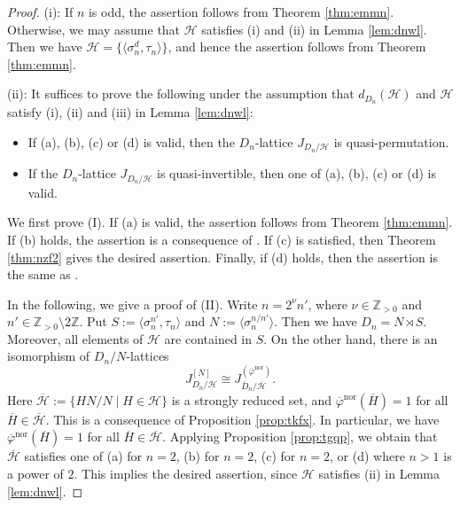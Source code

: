 \documentclass[12pt]{amsart}
\theoremstyle{plain}
\theoremstyle{definition}
\numberwithin{thm}{section}
\numberwithin{equation}{section}
\newcommand{\Zpn}{\mathbb{Z}_{>0}}
\newcommand{\Z}{\mathbb{Z}}
\newcommand{\cH}{\mathcal{H}}
\DeclareMathOperator{\nor}{nor}
\begin{document}
\begin{proof}
(i): If $n$ is odd, the assertion follows from Theorem \ref{thm:emmn}. Otherwise, we may assume that $\cH$ satisfies (i) and (ii) in Lemma \ref{lem:dnwl}. Then we have $\cH=\{\langle \sigma_{n}^{d},\tau_{n}\rangle\}$, and hence the assertion follows from Theorem \ref{thm:emmn}. 

(ii): It suffices to prove the following under the assumption that $d_{D_{n}}(\cH)$ and $\cH$ satisfy (i), (ii) and (iii) in Lemma \ref{lem:dnwl}: 
\begin{itemize}
    \item[(I)] If (a), (b), (c) or (d) is valid, then the $D_{n}$-lattice $J_{D_{n}/\cH}$ is quasi-permutation. 
    \item[(I\hspace{-1pt}I)] If the $D_{n}$-lattice $J_{D_{n}/\cH}$ is quasi-invertible, then one of (a), (b), (c) or (d) is valid. 
\end{itemize}
We first prove (I). If (a) is valid, the assertion follows from Theorem \ref{thm:emmn}. If (b) holds, the assertion is a consequence of \cite[Theorem 1.2 (ii)]{Hoshi2024}. If (c) is satisfied, then Theorem \ref{thm:nzf2} gives the desired assertion. Finally, if (d) holds, then the assertion is the same as \cite[Theorem 6.1]{Hasegawa}. 

In the following, we give a proof of (I\hspace{-1pt}I). Write $n=2^{\nu}n'$, where $\nu \in \Zpn$ and $n'\in \Zpn \setminus 2\Z$. Put $S:=\langle \sigma_{n}^{n'},\tau_{n}\rangle$ and $N:=\langle \sigma_{n}^{n/n'}\rangle$. Then we have $D_{n}=N \rtimes S$. Moreover, all elements of $\cH$ are contained in $S$. 
On the other hand, there is an isomorphism of $D_{n}/N$-lattices
\begin{equation*}
J_{D_{n}/\cH}^{[N]}\cong J_{\overline{D}_{n}/\overline{\cH}}^{(\overline{\varphi}^{\nor})}.  
\end{equation*}
Here $\overline{\cH}:=\{HN/N\mid H\in \cH\}$ is a strongly reduced set, and $\overline{\varphi}^{\nor}(\overline{H})=1$ for all $\overline{H}\in \overline{\cH}$. This is a consequence of Proposition \ref{prop:tkfx}. In particular, we have $\overline{\varphi}^{\nor}(\overline{H})=1$ for all $\overline{H}\in \overline{\cH}$. Applying Proposition \ref{prop:tgqp}, we obtain that $\overline{\cH}$ satisfies one of (a) for $n=2$, (b) for $n=2$, (c) for $n=2$, or (d) where $n>1$ is a power of $2$. This implies the desired assertion, since $\cH$ satisfies (ii) in Lemma \ref{lem:dnwl}. 
\end{proof}
\end{document}
